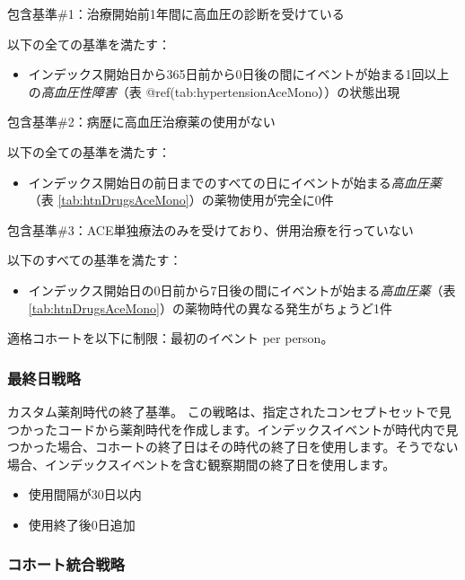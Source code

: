 \documentclass[
  11pt]{book}
\providecommand{\tightlist}{%
  \setlength{\itemsep}{0pt}\setlength{\parskip}{0pt}}
\theoremstyle{definition}
\theoremstyle{definition}
\theoremstyle{definition}
\theoremstyle{definition}
\theoremstyle{remark}
\begin{document}
包含基準\#1：治療開始前1年間に高血圧の診断を受けている

以下の全ての基準を満たす：

\begin{itemize}
\tightlist
\item
  インデックス開始日から365日前から0日後の間にイベントが始まる1回以上の\emph{高血圧性障害}（表 @ref(tab:hypertensionAceMono））の状態出現
\end{itemize}

包含基準\#2：病歴に高血圧治療薬の使用がない

以下の全ての基準を満たす：

\begin{itemize}
\tightlist
\item
  インデックス開始日の前日までのすべての日にイベントが始まる\emph{高血圧薬}（表 \ref{tab:htnDrugsAceMono}）の薬物使用が完全に0件
\end{itemize}

包含基準\#3：ACE単独療法のみを受けており、併用治療を行っていない

以下のすべての基準を満たす：

\begin{itemize}
\tightlist
\item
  インデックス開始日の0日前から7日後の間にイベントが始まる\emph{高血圧薬}（表 \ref{tab:htnDrugsAceMono}）の薬物時代の異なる発生がちょうど1件
\end{itemize}

適格コホートを以下に制限：最初のイベント per person。

\subsubsection*{最終日戦略}\label{ux6700ux7d42ux65e5ux6226ux7565-1}

カスタム薬剤時代の終了基準。
この戦略は、指定されたコンセプトセットで見つかったコードから薬剤時代を作成します。インデックスイベントが時代内で見つかった場合、コホートの終了日はその時代の終了日を使用します。そうでない場合、インデックスイベントを含む観察期間の終了日を使用します。

\begin{itemize}
\tightlist
\item
  使用間隔が30日以内
\item
  使用終了後0日追加
\end{itemize}

\subsubsection*{コホート統合戦略}\label{ux30b3ux30dbux30fcux30c8ux7d71ux5408ux6226ux7565-1}
\end{document}
